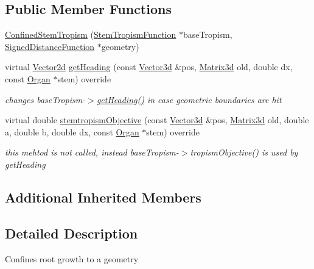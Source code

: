 \subsection*{Public Member Functions}
\begin{DoxyCompactItemize}
\item 
\hyperlink{classCPlantBox_1_1ConfinedStemTropism_a20fe8bddeb8063c0d2649bb8ae609a25}{Confined\+Stem\+Tropism} (\hyperlink{classCPlantBox_1_1StemTropismFunction}{Stem\+Tropism\+Function} $\ast$base\+Tropism, \hyperlink{classCPlantBox_1_1SignedDistanceFunction}{Signed\+Distance\+Function} $\ast$geometry)
\item 
virtual \hyperlink{classCPlantBox_1_1Vector2d}{Vector2d} \hyperlink{classCPlantBox_1_1ConfinedStemTropism_a4c662d9319b16894fca6e5ec30461312}{get\+Heading} (const \hyperlink{classCPlantBox_1_1Vector3d}{Vector3d} \&pos, \hyperlink{classCPlantBox_1_1Matrix3d}{Matrix3d} old, double dx, const \hyperlink{classCPlantBox_1_1Organ}{Organ} $\ast$stem) override
\begin{DoxyCompactList}\small\item\em changes base\+Tropism-\/$>$\hyperlink{classCPlantBox_1_1ConfinedStemTropism_a4c662d9319b16894fca6e5ec30461312}{get\+Heading()} in case geometric boundaries are hit \end{DoxyCompactList}\item 
\mbox{\label{classCPlantBox_1_1ConfinedStemTropism_a7adf792bf5816a82995adce13dc3b067}} 
virtual double \hyperlink{classCPlantBox_1_1ConfinedStemTropism_a7adf792bf5816a82995adce13dc3b067}{stemtropism\+Objective} (const \hyperlink{classCPlantBox_1_1Vector3d}{Vector3d} \&pos, \hyperlink{classCPlantBox_1_1Matrix3d}{Matrix3d} old, double a, double b, double dx, const \hyperlink{classCPlantBox_1_1Organ}{Organ} $\ast$stem) override
\begin{DoxyCompactList}\small\item\em this mehtod is not called, instead base\+Tropism-\/$>$tropism\+Objective() is used by get\+Heading \end{DoxyCompactList}\end{DoxyCompactItemize}
\subsection*{Additional Inherited Members}


\subsection{Detailed Description}
Confines root growth to a geometry 


